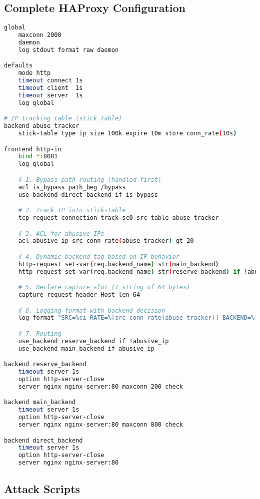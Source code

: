\documentclass[12pt]{article}
\begin{document}
\subsection{Complete HAProxy Configuration}
\begin{lstlisting}[language=bash, caption=Complete HAProxy Configuration]
global
    maxconn 2000
    daemon
    log stdout format raw daemon

defaults
    mode http
    timeout connect 1s
    timeout client  1s
    timeout server  1s
    log global

# IP tracking table (stick table)
backend abuse_tracker
    stick-table type ip size 100k expire 10m store conn_rate(10s)

frontend http-in
    bind *:8081
    log global

    # 1. Bypass path routing (handled first)
    acl is_bypass path_beg /bypass
    use_backend direct_backend if is_bypass

    # 2. Track IP into stick-table
    tcp-request connection track-sc0 src table abuse_tracker

    # 3. ACL for abusive IPs
    acl abusive_ip src_conn_rate(abuse_tracker) gt 20

    # 4. Dynamic backend tag based on IP behavior
    http-request set-var(req.backend_name) str(main_backend)
    http-request set-var(req.backend_name) str(reserve_backend) if !abusive_ip

    # 5. Declare capture slot (1 string of 64 bytes)
    capture request header Host len 64

    # 6. Logging format with backend decision
    log-format "SRC=%ci RATE=%[src_conn_rate(abuse_tracker)] BACKEND=%[var(req.backend_name)]"

    # 7. Routing
    use_backend reserve_backend if !abusive_ip
    use_backend main_backend if abusive_ip

backend reserve_backend
    timeout server 1s
    option http-server-close
    server nginx nginx-server:80 maxconn 200 check

backend main_backend
    timeout server 1s
    option http-server-close
    server nginx nginx-server:80 maxconn 800 check

backend direct_backend
    timeout server 1s
    option http-server-close
    server nginx nginx-server:80
\end{lstlisting}

\subsection{Attack Scripts}
\end{document}
